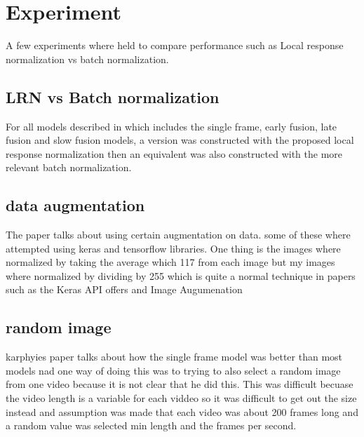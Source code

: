 \section{Experiment}

    A few experiments where held to compare performance such as Local response normalization vs batch normalization.
    \subsection{LRN vs Batch normalization}
    For all models described in \citep{KarpathyCVPR14} which includes the single frame, early fusion, late fusion and slow fusion models, a version was constructed with the proposed local response normalization then an equivalent was also constructed with the more relevant batch normalization.  

    \subsection{data augmentation}
    The \citep{KarpathyCVPR14} paper talks about using certain augmentation on data. some of these where attempted using keras and tensorflow libraries. One thing is the images where normalized by taking the average  which 117 from each image but my images where normalized by dividing by 255 which is quite a normal technique in papers such as
    the Keras API offers and Image Augumenation 
    
    
    
    \subsection{random image}
    karphyies paper talks about how the single frame model was better than most models nad one 
    way of doing this was to trying to also select a random image from one video because it is not clear that he did this. This was difficult becuase the video length is a variable for each viddeo so it was difficult to get out the size instead and assumption was made that each video was about 200 frames long and a random value  was selected \citep{soomro2012ucf101} min length and the frames per second.
    
